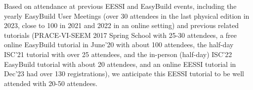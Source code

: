 Based on attendance at previous EESSI and EasyBuild events, including the yearly EasyBuild User Meetings (over 30
attendees in the last physical edition in 2023, close to 100 in 2021 and 2022 in an online setting) and previous
related tutorials (PRACE-VI-SEEM 2017 Spring School with 25-30 attendees, a free online EasyBuild tutorial in June'20
with about 100 attendees, the half-day ISC'21 tutorial with over 25 attendees, and the in-person (half-day) ISC'22
EasyBuild tutorial with about 20 attendees, and an online EESSI tutorial in Dec'23 had over 130 registrations), we
anticipate this EESSI tutorial to be well attended with 20-50 attendees.



